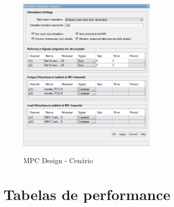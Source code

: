 \begin{apendicesenv}
\begin{figure}[!h]
	\caption{MPC Design - Cenário}
	\begin{center}
		\includegraphics[width=0.60\textwidth]{./5_images/mpcdesign_scenarios.png} 
		\label{fig:mpcdesign_scenarios}
	\end{center}
	\centering
\end{figure}

\clearpage

\section{Tabelas de performance}


\end{apendicesenv}
